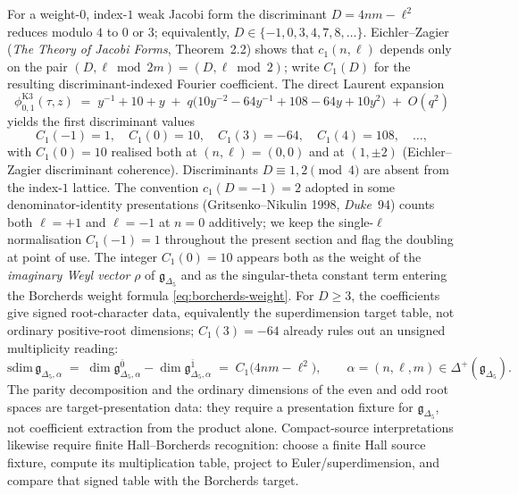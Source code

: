 For a weight-$0$, index-$1$ weak Jacobi form the discriminant $D = 4nm - \ell^2$ reduces modulo $4$ to $0$ or $3$; equivalently, $D \in \{-1, 0, 3, 4, 7, 8, \ldots\}$. Eichler--Zagier (\emph{The Theory of Jacobi Forms}, Theorem~2.2) shows that $c_1(n, \ell)$ depends only on the pair $(D, \ell \bmod 2m) = (D, \ell \bmod 2)$; write $C_1(D)$ for the resulting discriminant-indexed Fourier coefficient. The direct Laurent expansion
\[
 \phi_{0, 1}^{\mathrm{K3}}(\tau, z) \;=\; y^{-1} + 10 + y \;+\; q\bigl(10 y^{-2} - 64 y^{-1} + 108 - 64 y + 10 y^2\bigr) \;+\; O(q^2)
\]
yields the first discriminant values
\[
 C_1(-1) = 1, \quad C_1(0) = 10, \quad C_1(3) = -64, \quad C_1(4) = 108, \quad \ldots,
\]
with $C_1(0) = 10$ realised both at $(n, \ell) = (0, 0)$ and at $(1, \pm 2)$ (Eichler--Zagier discriminant coherence). Discriminants $D \equiv 1, 2 \pmod 4$ are absent from the index-$1$ lattice. The convention $c_1(D = -1) = 2$ adopted in some denominator-identity presentations (Gritsenko--Nikulin 1998, \emph{Duke}~94) counts both $\ell = +1$ and $\ell = -1$ at $n = 0$ additively; we keep the single-$\ell$ normalisation $C_1(-1) = 1$ throughout the present section and flag the doubling at point of use. The integer $C_1(0) = 10$ appears both as the weight of the \emph{imaginary Weyl vector} $\rho$ of $\mathfrak g_{\Delta_5}$ and as the singular-theta constant term entering the Borcherds weight formula \eqref{eq:borcherds-weight}. For $D \geq 3$, the coefficients give signed root-character data, equivalently the superdimension target table, not ordinary positive-root dimensions; $C_1(3) = -64$ already rules out an unsigned multiplicity reading:
\[
 \mathrm{sdim}\,\mathfrak g_{\Delta_5,\alpha}
 \;=\; \dim \mathfrak g_{\Delta_5,\alpha}^{\bar 0} - \dim \mathfrak g_{\Delta_5,\alpha}^{\bar 1}
 \;=\; C_1\bigl(4nm - \ell^2\bigr), \qquad \alpha = (n, \ell, m) \in \Delta^+(\mathfrak g_{\Delta_5}).
\]
The parity decomposition and the ordinary dimensions of the even and odd root spaces are target-presentation data: they require a presentation fixture for $\mathfrak g_{\Delta_5}$, not coefficient extraction from the product alone. Compact-source interpretations likewise require finite Hall--Borcherds recognition: choose a finite Hall source fixture, compute its multiplication table, project to Euler/superdimension, and compare that signed table with the Borcherds target.

